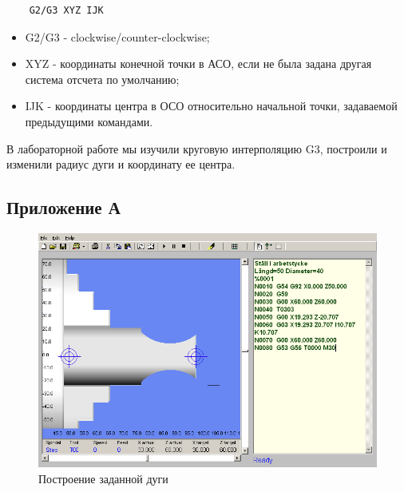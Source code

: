 \begin{verbatim}
    G2/G3 XYZ IJK
\end{verbatim}

\begin{itemize}
    \item G2/G3 - clockwise/counter-clockwise;
    \item XYZ - координаты конечной точки в АСО, если не была задана другая система отсчета по умолчанию;
    \item IJK - координаты центра в ОСО относительно начальной точки, задаваемой предыдущими командами.
\end{itemize}

В лабораторной работе мы изучили круговую интерполяцию G3, построили и изменили радиус дуги и координату ее центра.

\clearpage

\subsection*{Приложение А}

\begin{figure}[ht]
\centering
    \includegraphics[height=.75\linewidth,angle=90]{1.png}
    \caption{Построение заданной дуги\label{fig:default}}
\end{figure}

